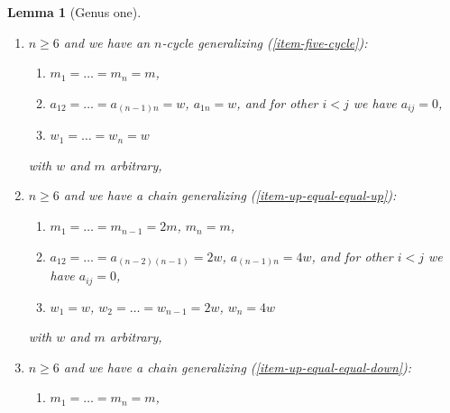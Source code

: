 \documentclass{stacks-project}
\theoremstyle{plain}
\newtheorem{lemma}[subsection]{Lemma}
\theoremstyle{definition}
\theoremstyle{remark}
\numberwithin{equation}{subsection}
\begin{document}
\begin{lemma}[Genus one]
\begin{enumerate}
$$\right),
\quad
\left(
\begin{matrix}
-2w & 2w & 0 & 0 & 0 \\
2w & -4w & 2w & 0 & 0 \\
0 & 2w & -4w & 2w & 2w \\
0 & 0 & 2w & -4w & 0 \\
0 & 0 & 2w & 0 & -4w \\
\end{matrix}
\right),
\quad
\left(
\begin{matrix}
w \\
2w \\
2w \\
2w \\
2w
\end{matrix}
\right),
\quad
\left(
\begin{matrix}
0 \\
0 \\
0 \\
0 \\
0
\end{matrix}
\right)
$$
with $w$ and $m$ arbitrary,
\item
\label{item-n-cycle}
$n \geq 6$ and we have an $n$-cycle generalizing (\ref{item-five-cycle}):
\begin{enumerate}
\item $m_1 = \ldots = m_n = m$,
\item $a_{12} = \ldots = a_{(n - 1) n} = w$, $a_{1n} = w$,
and for other $i < j$ we have $a_{ij} = 0$,
\item $w_1 = \ldots = w_n = w$
\end{enumerate}
with $w$ and $m$ arbitrary,
\item
\label{item-up-chain-equal-up}
$n \geq 6$ and we have a chain generalizing (\ref{item-up-equal-equal-up}):
\begin{enumerate}
\item $m_1 = \ldots = m_{n - 1} = 2m$, $m_n = m$,
\item $a_{12} = \ldots = a_{(n - 2) (n - 1)} = 2w$, $a_{(n - 1) n} = 4w$,
and for other $i < j$ we have $a_{ij} = 0$,
\item $w_1 = w$, $w_2 = \ldots = w_{n - 1} = 2w$, $w_n = 4w$
\end{enumerate}
with $w$ and $m$ arbitrary,
\item
\label{item-up-chain-equal-down}
$n \geq 6$ and we have a chain generalizing (\ref{item-up-equal-equal-down}):
\begin{enumerate}
\item $m_1 = \ldots = m_n = m$,

\end{enumerate}
\end{enumerate}
\end{lemma}
\end{document}
